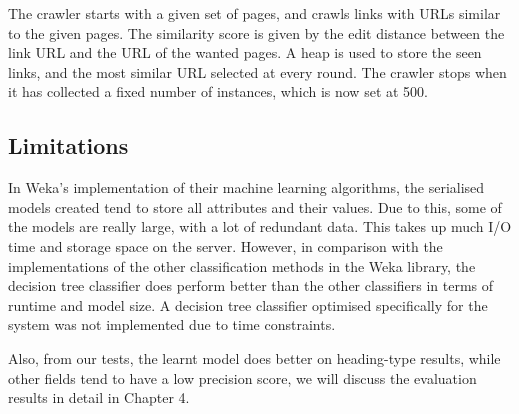 The crawler starts with a given set of pages, and crawls links with URLs similar to the given pages. The similarity score is given by the edit distance between the link URL and the URL of the wanted pages. A heap is used to store the seen links, and the most similar URL selected at every round. The crawler stops when it has collected a fixed number of instances, which is now set at 500.
	
\subsection{Limitations}
In Weka's implementation of their machine learning algorithms, the serialised models created
tend to store all attributes and their values. Due to this, some of the models are really large,
with a lot of redundant data. This takes up much I/O time and storage space on the server. However,
in comparison with the implementations of the other classification methods in the Weka 
library, the decision tree classifier does perform better than the other classifiers in terms
of runtime and model size. A decision tree classifier optimised specifically for the system
was not implemented due to time constraints.

Also, from our tests, the learnt model does better on heading-type results, while other
fields tend to have a low precision score, we will discuss the evaluation results in detail
in Chapter 4.
	
	

